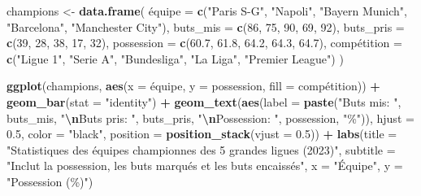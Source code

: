 \documentclass[
]{article}
\newenvironment{Shaded}{\begin{snugshade}}{\end{snugshade}}
\newcommand{\AttributeTok}[1]{\textcolor[rgb]{0.13,0.29,0.53}{#1}}
\newcommand{\DecValTok}[1]{\textcolor[rgb]{0.00,0.00,0.81}{#1}}
\newcommand{\FloatTok}[1]{\textcolor[rgb]{0.00,0.00,0.81}{#1}}
\newcommand{\FunctionTok}[1]{\textcolor[rgb]{0.13,0.29,0.53}{\textbf{#1}}}
\newcommand{\NormalTok}[1]{#1}
\newcommand{\OtherTok}[1]{\textcolor[rgb]{0.56,0.35,0.01}{#1}}
\newcommand{\SpecialCharTok}[1]{\textcolor[rgb]{0.81,0.36,0.00}{\textbf{#1}}}
\newcommand{\StringTok}[1]{\textcolor[rgb]{0.31,0.60,0.02}{#1}}
\begin{document}
\begin{Shaded}
\begin{Highlighting}[]
\NormalTok{champions }\OtherTok{\textless{}{-}} \FunctionTok{data.frame}\NormalTok{(}
\NormalTok{  é}\AttributeTok{quipe =} \FunctionTok{c}\NormalTok{(}\StringTok{"Paris S{-}G"}\NormalTok{, }\StringTok{"Napoli"}\NormalTok{, }\StringTok{"Bayern Munich"}\NormalTok{, }\StringTok{"Barcelona"}\NormalTok{, }\StringTok{"Manchester City"}\NormalTok{),}
  \AttributeTok{buts\_mis =} \FunctionTok{c}\NormalTok{(}\DecValTok{86}\NormalTok{, }\DecValTok{75}\NormalTok{, }\DecValTok{90}\NormalTok{, }\DecValTok{69}\NormalTok{, }\DecValTok{92}\NormalTok{),}
  \AttributeTok{buts\_pris =} \FunctionTok{c}\NormalTok{(}\DecValTok{39}\NormalTok{, }\DecValTok{28}\NormalTok{, }\DecValTok{38}\NormalTok{, }\DecValTok{17}\NormalTok{, }\DecValTok{32}\NormalTok{),}
  \AttributeTok{possession =} \FunctionTok{c}\NormalTok{(}\FloatTok{60.7}\NormalTok{, }\FloatTok{61.8}\NormalTok{, }\FloatTok{64.2}\NormalTok{, }\FloatTok{64.3}\NormalTok{, }\FloatTok{64.7}\NormalTok{),}
\NormalTok{  compétition }\OtherTok{=} \FunctionTok{c}\NormalTok{(}\StringTok{"Ligue 1"}\NormalTok{, }\StringTok{"Serie A"}\NormalTok{, }\StringTok{"Bundesliga"}\NormalTok{, }\StringTok{"La Liga"}\NormalTok{, }\StringTok{"Premier League"}\NormalTok{)}
\NormalTok{)}

\FunctionTok{ggplot}\NormalTok{(champions, }\FunctionTok{aes}\NormalTok{(}\AttributeTok{x =}\NormalTok{ équipe, }\AttributeTok{y =}\NormalTok{ possession, }\AttributeTok{fill =}\NormalTok{ compétition)) }\SpecialCharTok{+}
  \FunctionTok{geom\_bar}\NormalTok{(}\AttributeTok{stat =} \StringTok{"identity"}\NormalTok{) }\SpecialCharTok{+}
  \FunctionTok{geom\_text}\NormalTok{(}\FunctionTok{aes}\NormalTok{(}\AttributeTok{label =} \FunctionTok{paste}\NormalTok{(}\StringTok{"Buts mis: "}\NormalTok{, buts\_mis, }\StringTok{"}\SpecialCharTok{\textbackslash{}n}\StringTok{Buts pris: "}\NormalTok{, buts\_pris, }\StringTok{"}\SpecialCharTok{\textbackslash{}n}\StringTok{Possession: "}\NormalTok{, possession, }\StringTok{"\%"}\NormalTok{)), }
            \AttributeTok{hjust =} \FloatTok{0.5}\NormalTok{, }\AttributeTok{color =} \StringTok{"black"}\NormalTok{, }\AttributeTok{position =} \FunctionTok{position\_stack}\NormalTok{(}\AttributeTok{vjust =} \FloatTok{0.5}\NormalTok{)) }\SpecialCharTok{+}
  \FunctionTok{labs}\NormalTok{(}\AttributeTok{title =} \StringTok{"Statistiques des équipes championnes des 5 grandes ligues (2023)"}\NormalTok{,}
       \AttributeTok{subtitle =} \StringTok{"Inclut la possession, les buts marqués et les buts encaissés"}\NormalTok{,}
       \AttributeTok{x =} \StringTok{"Équipe"}\NormalTok{,}
       \AttributeTok{y =} \StringTok{"Possession (\%)"}\NormalTok{)}
\end{Highlighting}
\end{Shaded}
\end{document}
